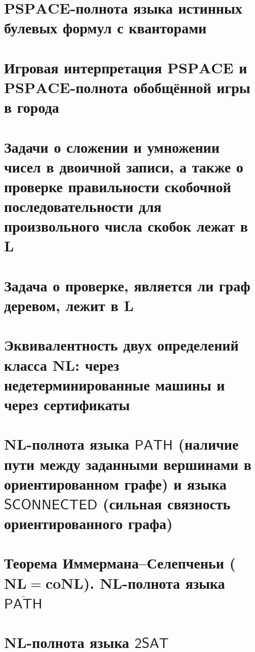 \section{$\mathbf{PSPACE}$-полнота языка истинных булевых формул с кванторами}\label{sec:pspc}


\section{Игровая интерпретация $\mathbf{PSPACE}$ и $\mathbf{PSPACE}$-полнота обобщённой игры в города}\label{sec:pspc2}


\section{Задачи о сложении и умножении чисел в двоичной записи, а также о проверке правильности скобочной последовательности для произвольного числа скобок лежат в $\mathbf{L}$}
\label{sec:arithmetic}

\section{Задача о проверке, является ли граф деревом, лежит в $\mathbf{L}$}


\section{Эквивалентность двух определений класса $\mathbf{NL}$: через недетерминированные машины и через сертификаты}


\section{$\mathbf{NL}$-полнота языка $\mathsf{PATH}$ (наличие пути между заданными вершинами в ориентированном графе) и языка $\mathsf{SCONNECTED}$ (сильная связность ориентированного графа)}\label{sec:sconnected}


\section{Теорема Иммермана–Селепченьи ($\mathbf{NL} = \mathbf{coNL}$). $\mathbf{NL}$-полнота языка $\overline{\mathsf{PATH}}$}


\section{$\mathbf{NL}$-полнота языка $\mathsf{2SAT}$}

\newpage

